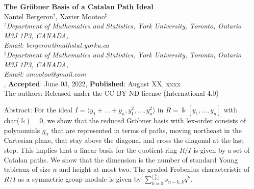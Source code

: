 \documentclass[10pt,a4paper]{article}
\def\field{\Bbbk}
\begin{document}
\baselineskip=0.20in

\vskip36pt


\begin{center}
{\large \bf The Gr\"obner Basis of a Catalan Path Ideal}\\[10pt]

Nantel Bergeron$^\dag$, Xavier Mootoo$^\ddag$\\[20pt]

\footnotesize {\it $^\dag$Department of Mathematics and Statistics, York  University, Toronto, Ontario M3J 1P3, CANADA,\\
Email: bergeron@mathstat.yorku.ca}\\[10pt]

\footnotesize {\it $^\ddag$Department of Mathematics and Statistics, York  University, Toronto, Ontario M3J 1P3, CANADA,\\
Email: xmootoo@gmail.com}\\[10pt]

,
{\footnotesize {\bf Accepted}: June 03, 2022}, {\footnotesize {\bf Published}: August XX, xxxx}\\

\noindent The authors: Released under the CC BY-ND license (International 4.0)
\end{center}

\setcounter{page}{1} \thispagestyle{empty}

\baselineskip=0.30in

\normalsize

\noindent
{\sc Abstract: For the ideal $I = \langle y_1 +  \dots + y_n, y^2_1, \dots , y^2_n \rangle$ in $R = \field[y_1, \dots , y_n]$ 
with char($\field$) = 0, we show that the reduced Gr\"obner basis with lex-order consists of polynomials $g_\alpha$ that are
represented in terms of paths, moving northeast in the Cartesian plane, that stay above the diagonal 
and cross the diagonal at the last step.  This implies that a linear basis for the quotient ring $R/I$ is given by a set of Catalan paths. We show that the dimension 
is the number of standard Young tableaux of size $n$ and height at most two. The graded Frobenius characteristic of $R/I$ as a symmetric group module is given by 
$\sum_{k=0}^{\lfloor \frac{n}{2} \rfloor } s_{n-k,k}q^k$.} 
\end{document}
